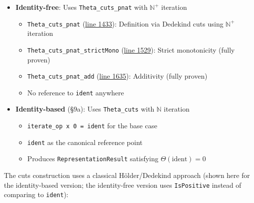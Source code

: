 \documentclass[11pt]{article}
\theoremstyle{definition}
\theoremstyle{remark}
\begin{document}
\begin{itemize}
\item \textbf{Identity-free}: Uses \texttt{Theta\_cuts\_pnat} with $\mathbb{N}^+$ iteration
  \begin{itemize}
  \item \texttt{Theta\_cuts\_pnat} (\href{https://github.com/zariuq/ks-foundations-of-inference/blob/main/KnuthSkilling/Additive/Proofs/DirectCuts/DirectCuts.lean\#L1433}{line 1433}): Definition via Dedekind cuts using $\mathbb{N}^+$ iteration
  \item \texttt{Theta\_cuts\_pnat\_strictMono} (\href{https://github.com/zariuq/ks-foundations-of-inference/blob/main/KnuthSkilling/Additive/Proofs/DirectCuts/DirectCuts.lean\#L1529}{line 1529}): Strict monotonicity (fully proven)
  \item \texttt{Theta\_cuts\_pnat\_add} (\href{https://github.com/zariuq/ks-foundations-of-inference/blob/main/KnuthSkilling/Additive/Proofs/DirectCuts/DirectCuts.lean\#L1635}{line 1635}): Additivity (fully proven)
  \item No reference to \texttt{ident} anywhere
  \end{itemize}

\item \textbf{Identity-based} (§9a): Uses \texttt{Theta\_cuts} with $\mathbb{N}$ iteration
  \begin{itemize}
  \item \texttt{iterate\_op x 0 = ident} for the base case
  \item \texttt{ident} as the canonical reference point
  \item Produces \texttt{RepresentationResult} satisfying $\Theta(\text{ident}) = 0$
  \end{itemize}
\end{itemize}

The cuts construction uses a classical Hölder/Dedekind approach (shown here for the identity-based version; the identity-free version uses \texttt{IsPositive} instead of comparing to \texttt{ident}):
\end{document}

